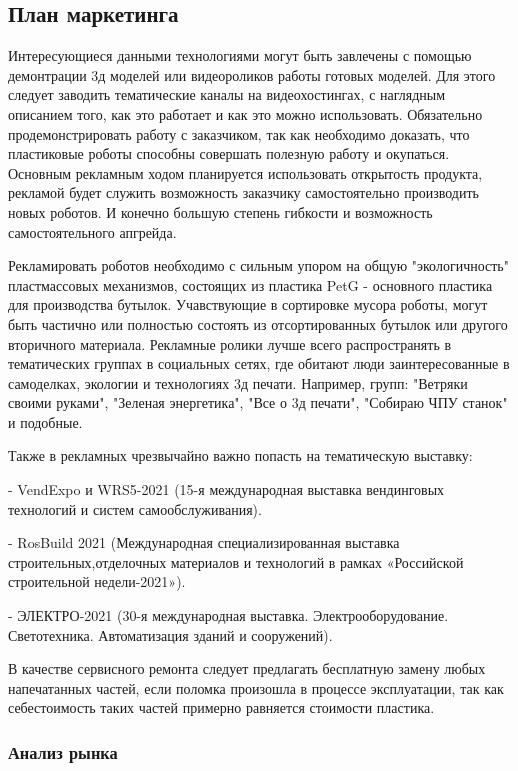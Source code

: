 \subsection{План маркетинга}
Интересующиеся данными технологиями могут быть завлечены с помощью демонтрации 3д моделей или видеороликов работы готовых моделей. Для этого следует заводить тематические каналы на видеохостингах, с наглядным описанием того, как это работает и как это можно использовать. Обязательно продемонстрировать работу с заказчиком, так как необходимо доказать, что пластиковые роботы способны совершать полезную работу и окупаться.
Основным рекламным ходом планируется использовать открытость продукта, рекламой будет служить возможность заказчику самостоятельно производить новых роботов. И конечно большую степень гибкости и возможность самостоятельного апгрейда.

Рекламировать роботов необходимо с сильным упором на общую "экологичность" пластмассовых механизмов, состоящих из пластика PetG - основного пластика для производства бутылок. Учавствующие в сортировке мусора роботы, могут быть частично или полностью состоять из отсортированных бутылок или другого вторичного материала. Рекламные ролики лучше всего распространять в тематических группах в социальных сетях, где обитают люди заинтересованные в самоделках, экологии и технологиях 3д печати. Например, групп: "Ветряки своими руками", "Зеленая энергетика", "Все о 3д печати", "Собираю ЧПУ станок" и подобные.

Также в рекламных чрезвычайно важно попасть на тематическую выставку:

- VendExpo и WRS5-2021 (15-я международная выставка вендинговых технологий и систем самообслуживания).

- RosBuild 2021 (Международная специализированная выставка строительных,отделочных материалов и технологий в рамках «Российской строительной недели-2021»).

- ЭЛЕКТРО-2021 (30-я международная выставка. Электрооборудование. Светотехника. Автоматизация зданий и сооружений).

В качестве сервисного ремонта следует предлагать бесплатную замену любых напечатанных частей, если поломка произошла в процессе эксплуатации, так как себестоимость таких частей примерно равняется стоимости пластика.

\subsubsection{Анализ рынка}

